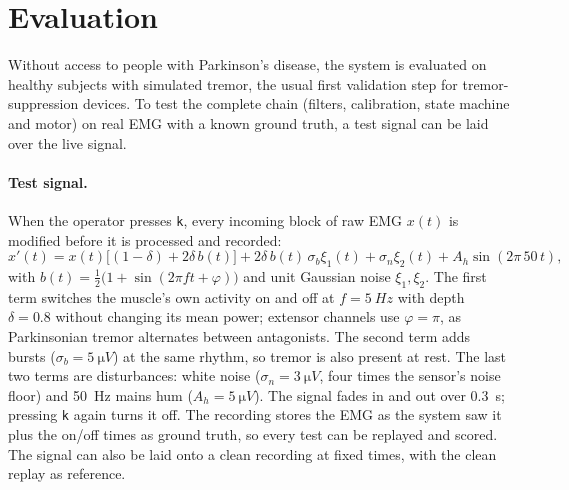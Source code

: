 \section{Evaluation}
\label{sec:evaluation}

Without access to people with Parkinson's disease, the system is evaluated on healthy
subjects with simulated tremor, the usual first validation step for tremor-suppression
devices. To test the complete chain (filters, calibration, state machine and motor) on
real EMG with a known ground truth, a test signal can be laid over the live signal.

\paragraph{Test signal.}
When the operator presses \texttt{k}, every incoming block of raw EMG $x(t)$ is modified
before it is processed and recorded:
\begin{equation}
  x'(t) = x(t)\big[(1-\delta) + 2\delta\, b(t)\big]
        + 2\delta\, b(t)\, \sigma_b \xi_1(t) + \sigma_n \xi_2(t) + A_h \sin(2\pi\,50\,t),
\end{equation}
with $b(t) = \tfrac12\big(1 + \sin(2\pi f t + \varphi)\big)$ and unit Gaussian noise
$\xi_1, \xi_2$. The first term switches the muscle's own activity on and off at
$f = \SI{5}{Hz}$ with depth $\delta = 0.8$ without changing its mean power; extensor
channels use $\varphi = \pi$, as Parkinsonian tremor alternates between antagonists. The
second term adds bursts ($\sigma_b = \SI{5}{\micro V}$) at the same rhythm, so tremor is
also present at rest. The last two terms are disturbances: white noise
($\sigma_n = \SI{3}{\micro V}$, four times the sensor's noise floor) and \SI{50}{Hz}
mains hum ($A_h = \SI{5}{\micro V}$). The signal fades in and out over \SI{0.3}{s};
pressing \texttt{k} again turns it off. The recording stores the EMG as the system saw
it plus the on/off times as ground truth, so every test can be replayed and scored. The
signal can also be laid onto a clean recording at fixed times, with the clean replay as
reference.

